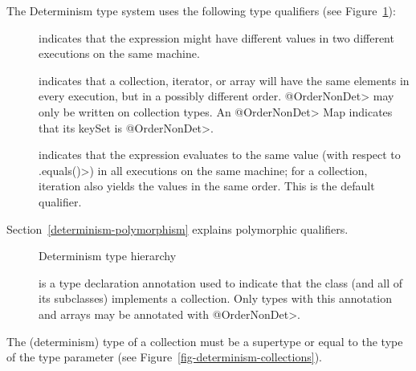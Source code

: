 
The Determinism type system uses the following type qualifiers (see Figure~\ref{fig-determinism-hierarchy}):
\begin{description}
\item[] indicates
  that the expression might have different values in two different executions on the same machine.
\item[] indicates that
  a collection, iterator, or array will have the same elements in every execution, but in a
  possibly different order.  \<@OrderNonDet> may only be written on
  collection types.
  An \<@OrderNonDet> Map indicates that its keySet is \<@OrderNonDet>.
\item[] indicates that
  the expression evaluates to the same value (with respect to \<.equals()>) in all
  executions on the same machine; for a collection, iteration also yields the values in the same
  order.
  This is the default qualifier.
\end{description}

Section~\ref{determinism-polymorphism} explains polymorphic qualifiers.

\begin{figure}
  \begin{center}
  \end{center}
\caption{Determinism type hierarchy}
\label{fig-determinism-hierarchy}
\end{figure}


\begin{description}
\item[] is a type declaration annotation used
  to indicate that the class (and all of its subclasses) implements a collection. Only types with this
  annotation and arrays may be annotated with \<@OrderNonDet>.
\end{description}


The (determinism) type of a collection must be a supertype or equal to
the type of the type parameter (see Figure~\ref{fig-determinism-collections}).

